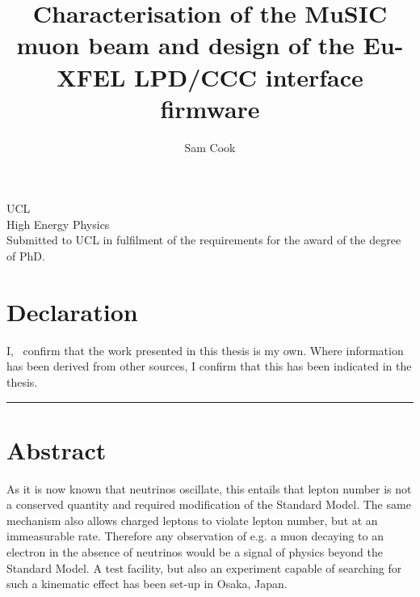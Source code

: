 \documentclass[12pt]{book}
\title{Characterisation of the MuSIC muon beam and design of the Eu-XFEL LPD/CCC interface firmware}
\author{Sam Cook}
\begin{document}
    

    \begin{titlepage}
      \begin{center}
        \vspace*{3cm}
        
        \huge
        \textbf{\thetitle}

        \vspace{2cm}

        \textbf{\theauthor}

        \vfill
        \large
        UCL\\
        \vspace{0.8cm}
        High Energy Physics\\
        \vspace{0.8cm}
        Submitted to UCL in fulfilment of the requirements for the award of the degree of PhD.

      \end{center}
    \end{titlepage}
    
    \chapter*{Declaration} %
      I, \theauthor\ confirm that the work presented in this thesis is my own.
      Where information has been derived from other sources, I confirm that
      this has been indicated in the thesis.
      \vspace*{3cm}
      \begin{flushright}
      \theauthor\hspace*{0.1\textwidth}\rule{0.5\textwidth}{0.25pt}
      \end{flushright}
    
    \chapter*{Abstract} %
      As it is now known that neutrinos oscillate, this entails that lepton number is not a conserved quantity and required modification of the Standard Model.  The same mechanism also allows charged leptons to violate lepton number, but at an immeasurable rate.  Therefore any observation of e.g. a muon decaying to an electron in the absence of neutrinos would be a signal of physics beyond the Standard Model.  A test facility, but also an experiment capable of searching for such a kinematic effect has been set-up in Osaka, Japan.
\end{document}
